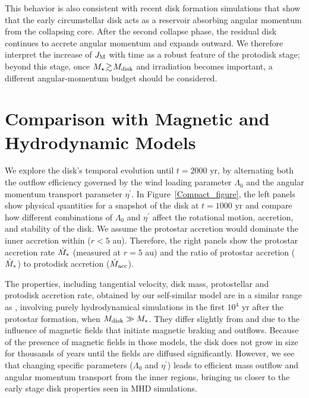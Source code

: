 \documentclass[twocolumn,linenumbers]{aastex631}
\begin{document}
This behavior is also consistent with recent disk formation simulations \citep[e.g.,][]{tsukamoto2022fragmentation}
that show that the early circumstellar disk acts as a reservoir absorbing angular momentum from the collapsing core.
After the second collapse phase, the residual disk continues to accrete angular momentum and expands outward. We therefore interpret the increase of $J_{\rm M}$ with time as a robust feature of the protodisk stage; beyond this stage, once $M_\star\!\gtrsim\!M_{\rm disk}$ and irradiation becomes important, a different angular-momentum budget should be considered.

\section{Comparison with Magnetic and Hydrodynamic Models}\label{Simul}

We explore the disk's temporal evolution until $t = 2000$ yr, by alternating both the outflow efficiency governed by the wind loading parameter $\Lambda_0$ and the angular momentum transport parameter $\eta^{\prime}$. In Figure~\ref{Compact_figure}, the left panels show physical quantities for a snapshot of the disk at $t = 1000$ yr and compare how different combinations of $\Lambda_0$ and $\eta^{\prime}$ affect the rotational motion, accretion, and stability of the disk. We assume the protostar accretion would dominate the inner accretion within ($r < 5$ au). Therefore, the right panels show 
the protostar accretion rate $\dot{M}_{\rm *}$ (measured at $r = 5$ au) and the ratio of protostar accretion  ($\dot{M}_{\rm *}$) to protodisk accretion ($\dot{M}_{\rm acc}$).

The properties, including tangential velocity, disk mass, protostellar and protodisk accretion rate,  obtained by our self-similar model are in a similar range as \cite{machida2010formation}, involving purely
hydrodynamical simulations in the first $10^4$ yr after the protostar formation, when $M_{\rm disk} \gg M_*$. They differ slightly from \cite{machida2011effect} and \cite{machida2019first} due to the influence of magnetic fields that initiate magnetic braking and outflows. Because of the presence of magnetic fields in those models, the disk does not grow in size for thousands of years until the fields are diffused significantly. However, we see that changing specific parameters ($\Lambda_0$ and $\eta^{\prime}$) leads to efficient mass outflow and angular momentum transport from the inner regions, bringing us closer to the early stage disk properties seen in MHD simulations.
\end{document}
